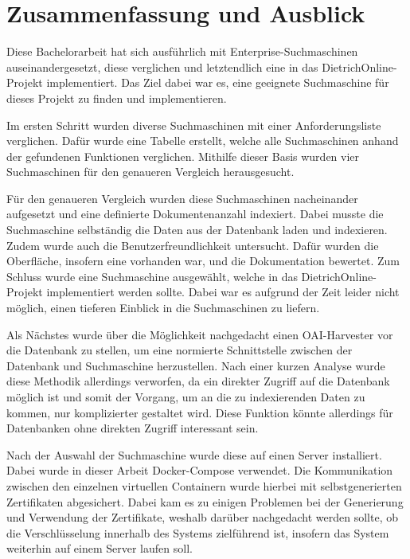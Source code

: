 \chapter{Zusammenfassung und Ausblick}

Diese Bachelorarbeit hat sich ausführlich mit Enterprise-Suchmaschinen auseinandergesetzt, diese verglichen und letztendlich eine in das DietrichOnline-Projekt implementiert. Das Ziel dabei war es, eine geeignete Suchmaschine für dieses Projekt zu finden und implementieren.  

Im ersten Schritt wurden diverse Suchmaschinen mit einer Anforderungsliste verglichen. Dafür wurde eine Tabelle erstellt, welche alle Suchmaschinen anhand der gefundenen Funktionen verglichen. Mithilfe dieser Basis wurden vier Suchmaschinen für den genaueren Vergleich herausgesucht.

Für den genaueren Vergleich wurden diese Suchmaschinen nacheinander aufgesetzt und eine definierte Dokumentenanzahl indexiert. Dabei musste die Suchmaschine selbständig die Daten aus der Datenbank laden und indexieren. Zudem wurde auch die Benutzerfreundlichkeit untersucht. Dafür wurden die Oberfläche, insofern eine vorhanden war, und die Dokumentation bewertet. Zum Schluss wurde eine Suchmaschine ausgewählt, welche in das DietrichOnline-Projekt implementiert werden sollte. Dabei war es aufgrund der Zeit leider nicht möglich, einen tieferen Einblick in die Suchmaschinen zu liefern.

Als Nächstes wurde über die Möglichkeit nachgedacht einen OAI-Harvester vor die Datenbank zu stellen, um eine normierte Schnittstelle zwischen der Datenbank und Suchmaschine herzustellen. Nach einer kurzen Analyse wurde diese Methodik allerdings verworfen, da ein direkter Zugriff auf die Datenbank möglich ist und somit der Vorgang, um an die zu indexierenden Daten zu kommen, nur komplizierter gestaltet wird. Diese Funktion könnte allerdings für Datenbanken ohne direkten Zugriff interessant sein. 

Nach der Auswahl der Suchmaschine wurde diese auf einen Server installiert. Dabei wurde in dieser Arbeit Docker-Compose verwendet. Die Kommunikation zwischen den einzelnen virtuellen Containern wurde hierbei mit selbstgenerierten Zertifikaten abgesichert. Dabei kam es zu einigen Problemen bei der Generierung und Verwendung der Zertifikate, weshalb darüber nachgedacht werden sollte, ob die Verschlüsselung innerhalb des Systems zielführend ist, insofern das System weiterhin auf einem Server laufen soll. 

